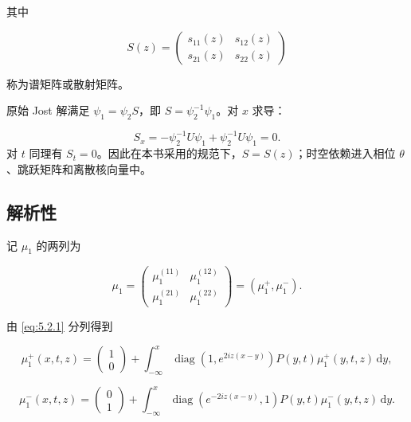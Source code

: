 \documentclass[
    lang=cn,
    scheme=chinese,
    mode=simple,
    device=normal,
    color=blue,
    math=cm,
    thmcnt=section,
    12pt,
    nowatermark
]{elegantbook}
\begin{document}
其中

\[
    S(z)=
    \begin{pmatrix}
        s_{11}(z) & s_{12}(z) \\
        s_{21}(z) & s_{22}(z)
    \end{pmatrix}
\]

称为谱矩阵或散射矩阵。

\begin{callout}[为什么 $S$ 与 $x,t$ 无关？]
    原始 Jost 解满足 $\psi_1=\psi_2S$，即 $S=\psi_2^{-1}\psi_1$。对 $x$ 求导：

    \[
        S_x
        =
        -\psi_2^{-1}U\psi_1+\psi_2^{-1}U\psi_1
        =0.
    \]
    对 $t$ 同理有 $S_t=0$。因此在本书采用的规范下，$S=S(z)$；时空依赖进入相位 $\theta$、跳跃矩阵和离散核向量中。
\end{callout}

\subsection{解析性}

记 $\mu_1$ 的两列为

\begin{equation}
    \mu_1
    =
    \begin{pmatrix}
        \mu_1^{(11)} & \mu_1^{(12)} \\
        \mu_1^{(21)} & \mu_1^{(22)}
    \end{pmatrix}
    =
    (\mu_1^+,\mu_1^-).
    \tag{5.2.4}
    \label{eq:5.2.4}
\end{equation}

由 \eqref{eq:5.2.1} 分列得到

\begin{equation}
    \mu_1^+(x,t,z)
    =
    \begin{pmatrix}1\\0\end{pmatrix}
    +
    \int_{-\infty}^{x}
    \operatorname{diag}\!\left(1,e^{2iz(x-y)}\right)
    P(y,t)\mu_1^+(y,t,z)\,\mathrm dy,
    \tag{5.2.5}
    \label{eq:5.2.5}
\end{equation}

\begin{equation}
    \mu_1^-(x,t,z)
    =
    \begin{pmatrix}0\\1\end{pmatrix}
    +
    \int_{-\infty}^{x}
    \operatorname{diag}\!\left(e^{-2iz(x-y)},1\right)
    P(y,t)\mu_1^-(y,t,z)\,\mathrm dy.
    \tag{5.2.6}
    \label{eq:5.2.6}
\end{equation}
\end{document}
